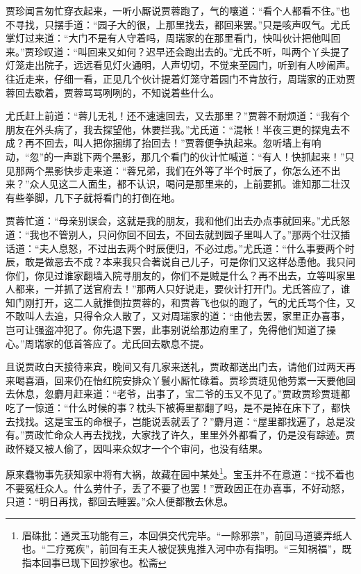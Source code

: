 \documentclass[12pt,oneside]{book}
\begin{document}
贾珍闻言匆忙穿衣起来，一听小厮说贾蓉跑了，气的嚷道：“看个人都看不住。”也不寻找，只摆手道：“园子大的很，上那里找去，都回来罢。”只是咳声叹气。尤氏掌灯过来道：“大门不是有人守着吗，周瑞家的在那里看门，快叫伙计把他叫回来。”贾珍叹道：“叫回来又如何？迟早还会跑出去的。”尤氏不听，叫两个丫头提了灯笼走出院子，远远看见灯火通明，人声切切，不觉来至园门，听到有人吵闹声。往近走来，仔细一看，正见几个伙计提着灯笼守着园门不肯放行，周瑞家的正劝贾蓉回去歇着，贾蓉骂骂咧咧的，不知说着些什么。

尤氏赶上前道：“蓉儿无礼！还不速速回去，又去那里？”贾蓉不耐烦道：“我有个朋友在外头病了，我去探望他，休要拦我。”尤氏道：“混帐！半夜三更的探鬼去不成？再不回去，叫人把你捆绑了抬回去！”贾蓉便争执起来。忽听墙上有响动，“忽”的一声跳下两个黑影，那几个看门的伙计忙喊道：“有人！快抓起来！”只见那两个黑影快步走来道：“蓉兄弟，我们在外等了半个时辰了，你怎么还不出来？”众人见这二人面生，都不认识，喝问是那里来的，上前要抓。谁知那二壮汉有些拳脚，几下子就将看门的打倒在地。

贾蓉忙道：“母亲别误会，这就是我的朋友，我和他们出去办点事就回来。”尤氏怒道：“我也不管别人，只问你回不回去，不回去就到园子里叫人了。”那两个壮汉插话道：“夫人息怒，不过出去两个时辰便归，不必过虑。”尤氏道：“什么事要两个时辰，敢是做恶去不成？本来我只合著说自己儿子，可是你们又这样怂恿他。我只问你们，你见过谁家翻墙入院寻朋友的，你们不是贼是什么？再不出去，立等叫家里人都来，一并抓了送官府去！”那两人只好说走，要伙计打开门。尤氏答应了，谁知门刚打开，这二人就推倒拉贾蓉的，和贾蓉飞也似的跑了，气的尤氏骂个住，又不敢叫人去追，只得令众人散了，又对周瑞家的道：“由他去罢，家里正办喜事，岂可让强盗冲犯了。你先退下罢，此事别说给那边府里了，免得他们知道了操心。”周瑞家的低首答应了。尤氏回去歇息不提。

且说贾政白天接待来宾，晚间又有几家来送礼，贾政都送出门去，请他们过两天再来喝喜酒，回来仍在怡红院安排众丫鬟小厮忙碌着。贾珍贾琏见他劳累一天要他回去休息，忽麝月赶来道：“老爷，出事了，宝二爷的玉又不见了。”贾政贾珍贾琏都吃了一惊道：“什么时候的事？枕头下被褥里都翻了吗，是不是掉在床下了，都快去找找。这是宝玉的命根子，岂能说丢就丢了？”麝月道：“屋里都找遍了，总是没有。”贾政忙命众人再去找找，大家找了许久，里里外外都看了，仍是没有踪迹。贾政怀疑又被人偷了，因叫来众奴才一个个审问，也没有结果。

原来蠢物事先获知家中将有大祸，故藏在园中某处\footnote{眉硃批：通灵玉功能有三，本回俱交代完毕。“一除邪祟”，前回马道婆弄纸人也。“二疗冤疾”，前回有王夫人被促狭鬼推入河中亦有指明。“三知祸福”，既指本回事已现下回抄家也。松斋}。宝玉并不在意道：“找不着也不要冤枉众人。什么劳什子，丢了不要了也罢！”贾政因正在办喜事，不好动怒，只道：“明日再找，都回去睡罢。”众人便都散去休息。
\end{document}

